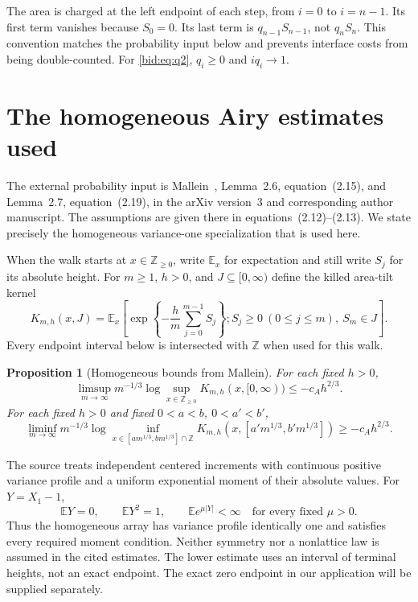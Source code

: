\documentclass[11pt,letterpaper]{article}
\numberwithin{equation}{section}
\newtheorem{proposition}[theorem]{Proposition}
\theoremstyle{remark}\newtheorem{remark}[theorem]{Remark}
\newcommand{\ZZ}{\mathbb Z}
\newcommand{\EE}{\mathbb E}
\begin{document}
The area is charged at the left endpoint of each step, from $i=0$ to
$i=n-1$. Its first term vanishes because $S_0=0$. Its last term is
$q_{n-1}S_{n-1}$, not $q_nS_n$. This convention matches the probability
input below and prevents interface costs from being double-counted.
For \eqref{bid:eq:q2}, $q_i\geq0$ and $iq_i\to1$.

\section{The homogeneous Airy estimates used}\label{bid:sec:input}
The external probability input is Mallein~\cite{mallein}, Lemma~2.6,
equation~(2.15), and Lemma~2.7, equation~(2.19), in the arXiv version~3
and corresponding author manuscript. The assumptions are given there
in equations~(2.12)--(2.13). We state precisely the homogeneous
variance-one specialization that is used here.

When the walk starts at $x\in\ZZ_{\geq0}$, write $\EE_x$ for expectation
and still write $S_j$ for its absolute height. For $m\geq1$, $h>0$, and
$J\subseteq[0,\infty)$ define the killed area-tilt kernel
\begin{equation}\label{bid:eq:kernel}
 K_{m,h}(x,J)=\EE_x\left[
 \exp\left\{-\frac hm\sum_{j=0}^{m-1}S_j\right\};
 S_j\geq0\ (0\leq j\leq m),\ S_m\in J\right].
\end{equation}
Every endpoint interval below is intersected with $\ZZ$ when used for
this walk.

\begin{proposition}[Homogeneous bounds from Mallein]\label{bid:prop:input}
For each fixed $h>0$,
\begin{equation}\label{bid:eq:upperinput}
 \limsup_{m\to\infty}m^{-1/3}
  \log\sup_{x\in\ZZ_{\geq0}}K_{m,h}(x,[0,\infty))
 \leq-c_Ah^{2/3}.
\end{equation}
For each fixed $h>0$ and fixed $0<a<b$, $0<a'<b'$,
\begin{equation}\label{bid:eq:lowerinput}
 \liminf_{m\to\infty}m^{-1/3}
 \log\inf_{x\in[a m^{1/3},b m^{1/3}]\cap\ZZ}
 K_{m,h}(x,[a'm^{1/3},b'm^{1/3}])
 \geq-c_Ah^{2/3}.
\end{equation}
\end{proposition}

The source treats independent centered increments with continuous
positive variance profile and a uniform exponential moment of their
absolute values. For $Y=X_1-1$,
\[
 \EE Y=0,\qquad \EE Y^2=1,\qquad
 \EE e^{\mu|Y|}<\infty\quad\text{for every fixed }\mu>0.
\]
Thus the homogeneous array has variance profile identically one and
satisfies every required moment condition. Neither symmetry nor a
nonlattice law is assumed in the cited estimates. The lower estimate
uses an interval of terminal heights, not an exact endpoint. The exact
zero endpoint in our application will be supplied separately.
\end{document}
